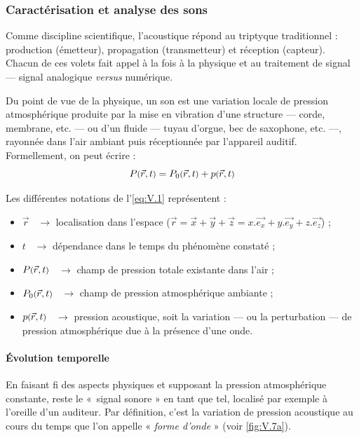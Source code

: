 \subsubsection[Caractérisation et analyse des sons]{Caractérisation et analyse des sons}
\label{subsub:V.2.2.1}

Comme discipline scientifique, l'acoustique répond au triptyque traditionnel : production (émetteur), propagation (transmetteur) et réception (capteur). Chacun de ces volets fait appel à la fois à la physique et au traitement de signal --- signal analogique \textit{versus} numérique. 


Du point de vue de la physique, un son est une variation locale de pression atmosphérique produite par la mise en vibration d'une structure --- corde, membrane, etc. --- ou d'un fluide --- tuyau d'orgue, bec de saxophone, etc. ---, rayonnée dans l'air ambiant puis réceptionnée par l'appareil auditif.
Formellement, on peut écrire :
\begin{equation}
P\mbox{\footnotesize (} \vec{r},t \mbox{\footnotesize )} = P_{0}\mbox{\footnotesize (} \vec{r},t \mbox{\footnotesize )} + p\mbox{\footnotesize (} \vec{r},t \mbox{\footnotesize )}
\label{eq:V.1}
\end{equation}

Les différentes notations de l'\cref{eq:V.1} représentent :
\begin{itemize}
	\item $\vec{r}$ ~$\rightarrow$ localisation dans l'espace 
($\vec{r} = \vec{x} + \vec{y} + \vec{z} = x.\vec{e_{x}} + y.\vec{e_{y}} + z.\vec{e_{z}}$) ;
	\item $t$ ~$\rightarrow$ dépendance dans le temps du phénomène constaté ;
	\item $P\mbox{\footnotesize (} \vec{r},t \mbox{\footnotesize )}$ ~$\rightarrow$ champ de pression totale existante dans l'air ;
	\item $P_{0}\mbox{\footnotesize (} \vec{r},t \mbox{\footnotesize )}$ ~$\rightarrow$ champ de pression atmosphérique ambiante ;
	\item $p\mbox{\footnotesize (} \vec{r},t \mbox{\footnotesize )}$ ~$\rightarrow$ pression acoustique, soit la variation --- ou la perturbation --- de pression atmosphérique due à la présence d'une onde.%
\end{itemize}

\paragraph*{Évolution temporelle} En faisant fi des aspects physiques et supposant la pression atmosphérique constante, reste le «~signal sonore » en tant que tel, localisé par exemple à l'oreille d'un auditeur. Par définition, c'est la variation de pression acoustique au cours du temps que l'on appelle « \emph{forme d'onde} » (voir \cref{fig:V.7a}). 

